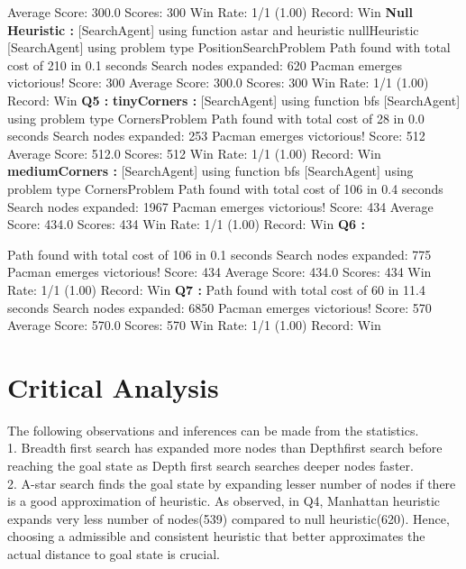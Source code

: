 \documentclass[11pt]{article}
\begin{document}
Average Score: 300.0
Scores:        300
Win Rate:      1/1 (1.00)
Record:        Win
{\bf Null Heuristic :}
[SearchAgent] using function astar and heuristic nullHeuristic
[SearchAgent] using problem type PositionSearchProblem
Path found with total cost of 210 in 0.1 seconds
Search nodes expanded: 620
Pacman emerges victorious! Score: 300
Average Score: 300.0
Scores:        300
Win Rate:      1/1 (1.00)
Record:        Win
{\bf Q5 :}
{\bf tinyCorners :}
[SearchAgent] using function bfs
[SearchAgent] using problem type CornersProblem
Path found with total cost of 28 in 0.0 seconds
Search nodes expanded: 253
Pacman emerges victorious! Score: 512
Average Score: 512.0
Scores:        512
Win Rate:      1/1 (1.00)
Record:        Win
{\bf mediumCorners :}
[SearchAgent] using function bfs
[SearchAgent] using problem type CornersProblem
Path found with total cost of 106 in 0.4 seconds
Search nodes expanded: 1967
Pacman emerges victorious! Score: 434
Average Score: 434.0
Scores:        434
Win Rate:      1/1 (1.00)
Record:        Win
{\bf Q6 :}

Path found with total cost of 106 in 0.1 seconds
Search nodes expanded: 775
Pacman emerges victorious! Score: 434
Average Score: 434.0
Scores:        434
Win Rate:      1/1 (1.00)
Record:        Win
{\bf Q7 :}
Path found with total cost of 60 in 11.4 seconds
Search nodes expanded: 6850
Pacman emerges victorious! Score: 570
Average Score: 570.0
Scores:        570
Win Rate:      1/1 (1.00)
Record:        Win
\egroup

\section{Critical Analysis}
The following observations and inferences can be made from the statistics.\\
1. Breadth first search has expanded  more nodes than Depthfirst search  before reaching the goal state  as Depth first search searches deeper nodes faster.\\

2. A-star search finds the goal state by expanding lesser number of nodes if there is a good approximation of heuristic. As observed, in Q4,  Manhattan heuristic expands very less number of nodes(539) compared to null heuristic(620). Hence, choosing a admissible and consistent heuristic that better approximates the actual distance to goal state is crucial.\\
\end{document}
